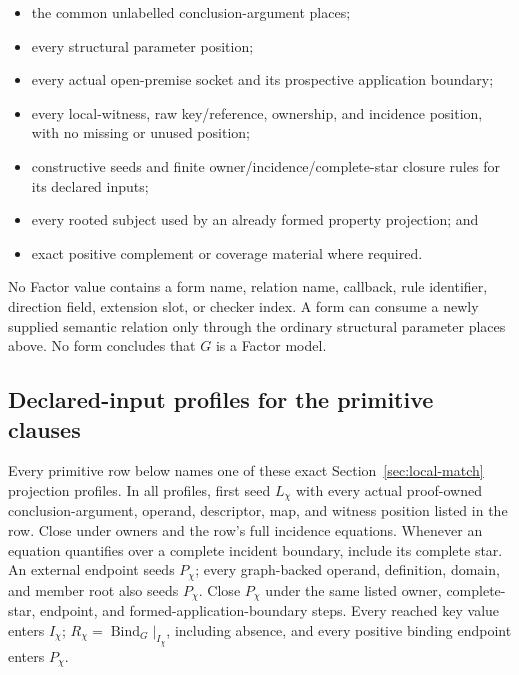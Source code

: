 \documentclass[11pt,twoside]{article}
\begin{document}
\begin{itemize}[leftmargin=2em]
  \item the common unlabelled conclusion-argument places;
  \item every structural parameter position;
  \item every actual open-premise socket and its prospective application boundary;
  \item every local-witness, raw key/reference, ownership, and incidence position,
        with no missing or unused position;
  \item constructive seeds and finite owner/incidence/complete-star closure rules
        for its declared inputs;
  \item every rooted subject used by an already formed property projection; and
  \item exact positive complement or coverage material where required.
\end{itemize}

No Factor value contains a form name, relation name, callback, rule identifier,
direction field, extension slot, or checker index.  A form can consume a newly
supplied semantic relation only through the ordinary structural parameter places
above.  No form concludes that \(G\) is a Factor model.

\subsection{Declared-input profiles for the primitive clauses}

Every primitive row below names one of these exact Section~\ref{sec:local-match}
projection profiles.  In all profiles, first seed \(L_\chi\) with every actual
proof-owned conclusion-argument, operand, descriptor, map, and witness position
listed in the row.  Close under owners and the row's full incidence equations.
Whenever an equation quantifies over a complete incident boundary, include its
complete star.  An external endpoint seeds \(P_\chi\); every graph-backed operand,
definition, domain, and member root also seeds \(P_\chi\).  Close \(P_\chi\) under
the same listed owner, complete-star, endpoint, and formed-application-boundary
steps.  Every reached key value enters \(I_\chi\);
\(R_\chi=\operatorname{Bind}_G|_{I_\chi}\), including absence, and every positive
binding endpoint enters \(P_\chi\).
\end{document}
